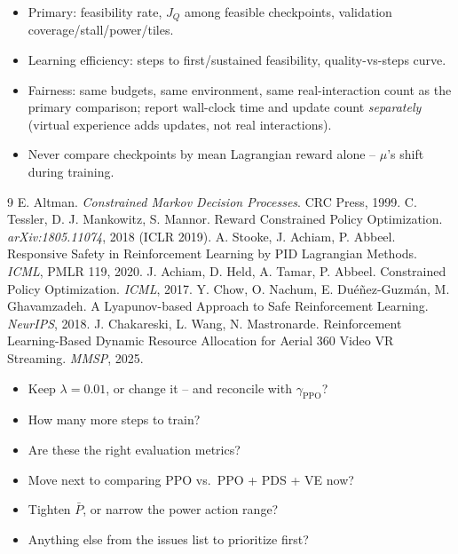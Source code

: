 \documentclass[aspectratio=169]{beamer}
\newcommand{\Pbar}{\bar P}
\begin{document}
\begin{frame}
\begin{itemize}
  \item Primary: feasibility rate, $J_Q$ among feasible checkpoints, validation coverage/stall/power/tiles.
  \item Learning efficiency: steps to first/sustained feasibility, quality-vs-steps curve.
  \item Fairness: same budgets, same environment, same real-interaction count as the primary comparison; report wall-clock time and update count \emph{separately} (virtual experience adds updates, not real interactions).
  \item Never compare checkpoints by mean Lagrangian reward alone -- $\mu$'s shift during training.
\end{itemize}
\end{frame}

\begin{frame}
\footnotesize
\begin{thebibliography}{9}
 E. Altman. \emph{Constrained Markov Decision Processes}. CRC Press, 1999.
 C. Tessler, D. J. Mankowitz, S. Mannor. Reward Constrained Policy Optimization. \emph{arXiv:1805.11074}, 2018 (ICLR 2019).
 A. Stooke, J. Achiam, P. Abbeel. Responsive Safety in Reinforcement Learning by PID Lagrangian Methods. \emph{ICML}, PMLR 119, 2020.
 J. Achiam, D. Held, A. Tamar, P. Abbeel. Constrained Policy Optimization. \emph{ICML}, 2017.
 Y. Chow, O. Nachum, E. Du\'e\~nez-Guzm\'an, M. Ghavamzadeh. A Lyapunov-based Approach to Safe Reinforcement Learning. \emph{NeurIPS}, 2018.
 J. Chakareski, L. Wang, N. Mastronarde. Reinforcement Learning-Based Dynamic Resource Allocation for Aerial 360\textdegree{} Video VR Streaming. \emph{MMSP}, 2025.
\end{thebibliography}
\end{frame}

\begin{frame}
\begin{itemize}
  \item Keep $\lambda=0.01$, or change it -- and reconcile with $\gamma_{\text{PPO}}$?
  \item How many more steps to train?
  \item Are these the right evaluation metrics?
  \item Move next to comparing PPO vs.\ PPO + PDS + VE now?
  \item Tighten $\Pbar$, or narrow the power action range?
  \item Anything else from the issues list to prioritize first?
\end{itemize}
\end{frame}
\end{document}

